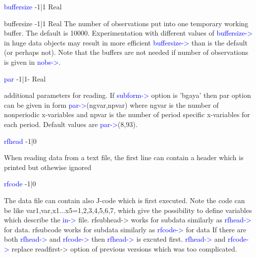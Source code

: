\vspace{0.3cm}
\hline
\vspace{0.3cm}
\noindent \textcolor{blue}{buffersize} \tabto{3cm} -1|1 \tabto{5cm}  Real \tabto{7cm}
\begin{changemargin}{3cm}{0cm}
\noindent \noindent buffersize \tabto{3cm} -1|1 \tabto{5cm}  Real \tabto{7cm}
The number of observations put into one temporary working buffer. The default
is 10000. Experimentation with different values of \textcolor{blue}{buffersize->} in huge data
objects may result in more efficient \textcolor{blue}{buffersize->} than is the default (or perhaps
not). Note that the buffers are not needed if number of observations is given in
\textcolor{blue}{nobs->}.
\end{changemargin}
\vspace{0.3cm}
\hline
\vspace{0.3cm}
\noindent \textcolor{blue}{par} \tabto{3cm} -1|1- \tabto{5cm}   Real \tabto{7cm}
\begin{changemargin}{3cm}{0cm}
\noindent additional parameters for reading. If \textcolor{blue}{subform->} option is 'bgaya' then par
option can be given in form \textcolor{blue}{par->}(ngvar,npvar) where ngvar is the number
of nonperiodic x-variables and npvar is the number of period specific x-variables
for each period. Default values are \textcolor{blue}{par->}(8,93).
\end{changemargin}
\vspace{0.3cm}
\hline
\vspace{0.3cm}
\noindent \textcolor{blue}{rfhead}  \tabto{3cm} -1|0 \tabto{5cm}    \tabto{7cm}
\begin{changemargin}{3cm}{0cm}
\noindent  When reading data from a text file, the first line can contain a header which is
printed but othewise ignored
\end{changemargin}
\vspace{0.3cm}
\hline
\vspace{0.3cm}
\noindent \textcolor{blue}{rfcode}  \tabto{3cm} -1|0 \tabto{5cm}    \tabto{7cm}
\begin{changemargin}{3cm}{0cm}
\noindent The data file can contain also J-code which is first executed. Note the code can
be like var1,var,x1...x5=1,2,3,4,5,6,7, which give the possibility to
define variables which describe the \textcolor{blue}{in->} file.
rfsubhead-> works for subdata similarly as \textcolor{blue}{rfhead->} for data.
rfsubcode works for subdata similarly as \textcolor{blue}{rfcode->} for data
If there are both \textcolor{blue}{rfhead->} and \textcolor{blue}{rfcode->} then \textcolor{blue}{rfhead->} is excuted first.
\textcolor{blue}{rfhead->} and \textcolor{blue}{rfcode->} replace readfirst-> option  of previous versions which was too
complicated.
\end {changemargin}
